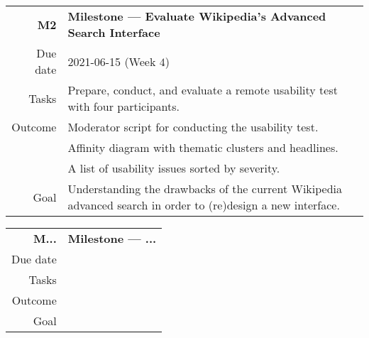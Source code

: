 \begin{table}[h]
\small
\colorbox{usethiscolorhere}{
\centering
\begin{tabularx}{\textwidth}{@{} r Y @{}}
	\textbf{M2}
	& \textbf{Milestone --- Evaluate Wikipedia's Advanced Search Interface}\vspace{2mm}\\
	Due date & 2021-06-15 (Week $4$)\vspace{2mm}\\
     Tasks & Prepare, conduct, and evaluate a remote usability test with four participants.\vspace{2mm}\\
    Outcome & Moderator script for conducting the usability test.\\
    & Affinity diagram with thematic clusters and headlines.\\
    & A list of usability issues sorted by severity.\vspace{2mm}\\
    Goal & Understanding the drawbacks of the current Wikipedia advanced search in order to (re)design a new interface.\vspace{2mm}\\
    
\end{tabularx}
}
\end{table}

\begin{table}[h]
\small
\colorbox{usethiscolorhere}{
\centering
\begin{tabularx}{\textwidth}{@{} r Y @{}}
	\textbf{M...}
	& \textbf{Milestone ---  ...}\vspace{2mm}\\
    Due date & \mbox{} \vspace{2mm}\\
    Tasks & \mbox{} \vspace{2mm}\\
    Outcome & \mbox{} \vspace{2mm}\\
    Goal & \mbox{} \vspace{2mm}\\
\end{tabularx}
}
\end{table}

